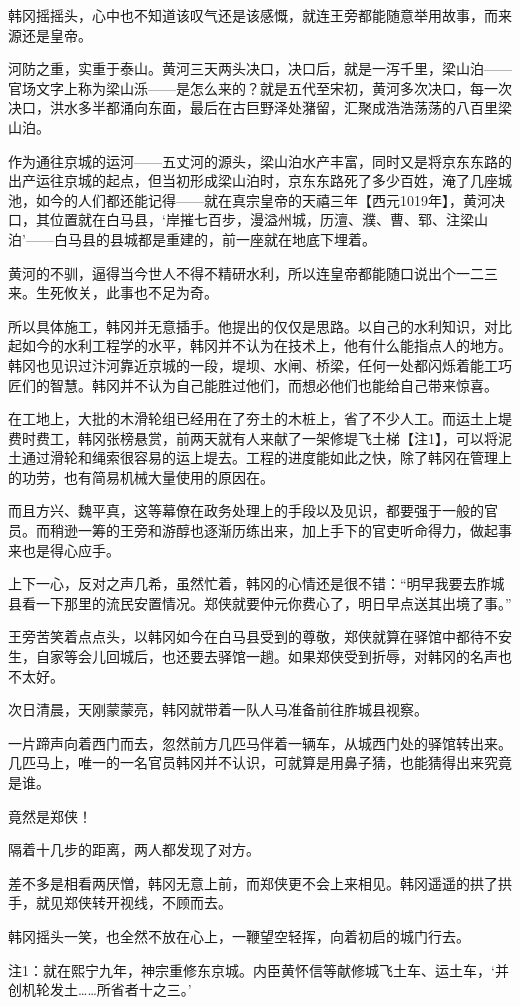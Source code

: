 韩冈摇摇头，心中也不知道该叹气还是该感慨，就连王旁都能随意举用故事，而来源还是皇帝。

河防之重，实重于泰山。黄河三天两头决口，决口后，就是一泻千里，梁山泊——官场文字上称为梁山泺——是怎么来的？就是五代至宋初，黄河多次决口，每一次决口，洪水多半都涌向东面，最后在古巨野泽处潴留，汇聚成浩浩荡荡的八百里梁山泊。

作为通往京城的运河——五丈河的源头，梁山泊水产丰富，同时又是将京东东路的出产运往京城的起点，但当初形成梁山泊时，京东东路死了多少百姓，淹了几座城池，如今的人们都还能记得——就在真宗皇帝的天禧三年【西元1019年】，黄河决口，其位置就在白马县，‘岸摧七百步，漫溢州城，历澶、濮、曹、郓、注梁山泊’——白马县的县城都是重建的，前一座就在地底下埋着。

黄河的不驯，逼得当今世人不得不精研水利，所以连皇帝都能随口说出个一二三来。生死攸关，此事也不足为奇。

所以具体施工，韩冈并无意插手。他提出的仅仅是思路。以自己的水利知识，对比起如今的水利工程学的水平，韩冈并不认为在技术上，他有什么能指点人的地方。韩冈也见识过汴河靠近京城的一段，堤坝、水闸、桥梁，任何一处都闪烁着能工巧匠们的智慧。韩冈并不认为自己能胜过他们，而想必他们也能给自己带来惊喜。

在工地上，大批的木滑轮组已经用在了夯土的木桩上，省了不少人工。而运土上堤费时费工，韩冈张榜悬赏，前两天就有人来献了一架修堤飞土梯【注1】，可以将泥土通过滑轮和绳索很容易的运上堤去。工程的进度能如此之快，除了韩冈在管理上的功劳，也有简易机械大量使用的原因在。

而且方兴、魏平真，这等幕僚在政务处理上的手段以及见识，都要强于一般的官员。而稍逊一筹的王旁和游醇也逐渐历练出来，加上手下的官吏听命得力，做起事来也是得心应手。

上下一心，反对之声几希，虽然忙着，韩冈的心情还是很不错：“明早我要去胙城县看一下那里的流民安置情况。郑侠就要仲元你费心了，明日早点送其出境了事。”

王旁苦笑着点点头，以韩冈如今在白马县受到的尊敬，郑侠就算在驿馆中都待不安生，自家等会儿回城后，也还要去驿馆一趟。如果郑侠受到折辱，对韩冈的名声也不太好。

次日清晨，天刚蒙蒙亮，韩冈就带着一队人马准备前往胙城县视察。

一片蹄声向着西门而去，忽然前方几匹马伴着一辆车，从城西门处的驿馆转出来。几匹马上，唯一的一名官员韩冈并不认识，可就算是用鼻子猜，也能猜得出来究竟是谁。

竟然是郑侠！

隔着十几步的距离，两人都发现了对方。

差不多是相看两厌憎，韩冈无意上前，而郑侠更不会上来相见。韩冈遥遥的拱了拱手，就见郑侠转开视线，不顾而去。

韩冈摇头一笑，也全然不放在心上，一鞭望空轻挥，向着初启的城门行去。

注1：就在熙宁九年，神宗重修东京城。内臣黄怀信等献修城飞土车、运土车，‘并创机轮发土……所省者十之三。’

